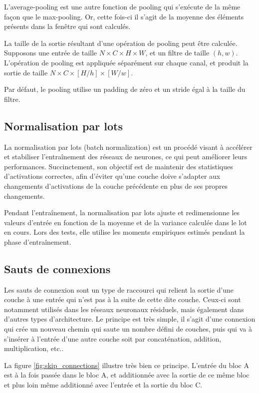 L'average-pooling est une autre fonction de pooling qui s'exécute de la même façon que le max-pooling. Or, cette fois-ci il s'agit de la moyenne des éléments présents dans la fenêtre qui sont calculés.

La taille de la sortie résultant d'une opération de pooling peut être calculée. Supposons une entrée de taille $N \times C \times H \times W$, et un filtre de taille $(h, w)$. L'opération de pooling est appliquée séparément sur chaque canal, et produit la sortie de taille $N \times C \times [H/h] \times [W/w]$.

Par défaut, le pooling utilise un padding de zéro et un stride égal à la taille du filtre. 

\subsection{Normalisation par lots}
\label{subsec:batch_norm}

La normalisation par lots (batch normalization) est un procédé visant à accélérer et stabiliser l'entraînement des réseaux de neurones, ce qui peut améliorer leurs performances. Succinctement, son objectif est de maintenir des statistiques d'activations correctes, afin d'éviter qu'une couche doive s'adapter aux changements d'activations de la couche précédente en plus de ses propres changements. 

Pendant l'entraînement, la normalisation par lots ajuste et redimensionne les valeurs d'entrée en fonction de la moyenne et de la variance calculée dans le lot en cours. Lors des tests, elle utilise les moments empiriques estimés pendant la phase d'entraînement.

\subsection{Sauts de connexions}
\label{subsec:skip_connections}

Les sauts de connexion sont un type de raccourci qui relient la sortie d'une couche à une entrée qui n'est pas à la suite de cette dite couche. Ceux-ci sont notamment utilisés dans les réseaux neuronaux résiduels, mais également dans d'autres types d'architecture. Le principe est très simple, il s'agit d'une connexion qui crée un nouveau chemin qui saute un nombre défini de couches, puis qui va à s'insérer à l'entrée d'une autre couche soit par concaténation, addition, multiplication, etc..

La figure \ref{fig:skip_connections} illustre très bien ce principe. L'entrée du bloc A est à la fois passée dans le bloc A, et additionnée avec la sortie de ce même bloc et plus loin même additionné avec l'entrée et la sortie du bloc C.

